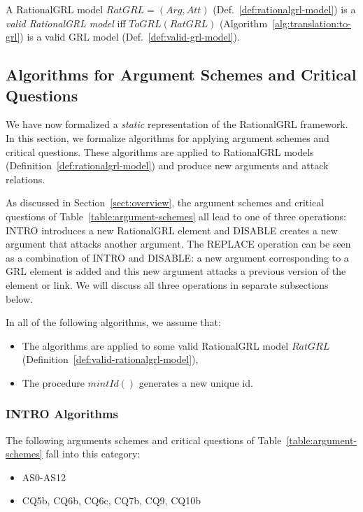 \begin{definition}
\label{def:valid-rationalgrl-model}
A RationalGRL model $RatGRL = (Arg, Att)$ (Def.~\ref{def:rationalgrl-model})
is a \emph{valid RationalGRL model} iff $ToGRL(RatGRL)$ (Algorithm~\ref{alg:translation:to-grl}) is a valid GRL model (Def.~\ref{def:valid-grl-model}).
\end{definition}


\subsection{Algorithms for Argument Schemes and Critical Questions}
\label{sect:algorithms}

We have now formalized a \emph{static} representation of the RationalGRL framework. In this section, we formalize algorithms for applying argument schemes and critical questions. These algorithms are applied to RationalGRL models (Definition~\ref{def:rationalgrl-model}) and produce new arguments and attack relations. 

As discussed in Section~\ref{sect:overview}, the argument schemes and critical questions of Table~\ref{table:argument-schemes} all lead to one of three operations: \textsf{INTRO}
introduces a new RationalGRL element and \textsf{DISABLE} creates a new argument that attacks another argument. The \textsf{REPLACE} operation can be seen as a combination of \textsf{INTRO} and \textsf{DISABLE}: a new argument corresponding to a GRL element is added and this new argument attacks a previous version of the element or link. We will discuss all three operations in separate subsections below.

In all of the following algorithms, we assume that:
\begin{itemize}
\item The algorithms are applied to some valid RationalGRL model $RatGRL$ (Definition~\ref{def:valid-rationalgrl-model}),
\item The procedure $mintId()$ generates a new unique id.
\end{itemize}

\subsubsection{INTRO Algorithms}
\label{sect:formalframework:intro}

The following arguments schemes and critical questions of Table~\ref{table:argument-schemes} fall into this category:
\begin{itemize}
\item AS0-AS12
\item CQ5b, CQ6b, CQ6c, CQ7b, CQ9, CQ10b
\end{itemize}

